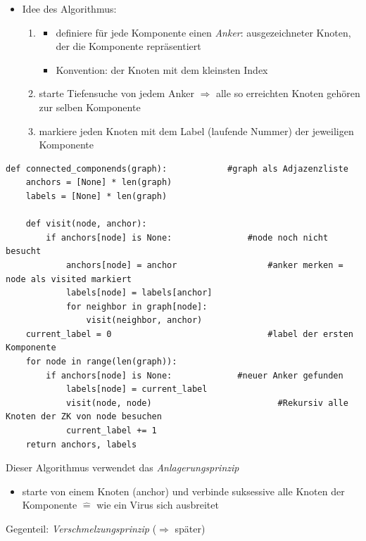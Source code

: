 \begin{itemize}
            \item Idee des Algorithmus:
            \begin{enumerate}
            \item
            \begin{itemize}
            \item definiere für jede Komponente einen \emph{Anker}: ausgezeichneter Knoten, der die Komponente repräsentiert
            \item Konvention: der Knoten mit dem kleinsten Index
            \end{itemize}
            \item starte Tiefensuche von jedem Anker $\Rightarrow$ alle so erreichten Knoten gehören zur selben Komponente
            \item markiere jeden Knoten mit dem Label (laufende Nummer) der jeweiligen Komponente
            \end{enumerate}
            \end{itemize}

            \begin{verbatim}
def connected_componends(graph):            #graph als Adjazenzliste
    anchors = [None] * len(graph)
    labels = [None] * len(graph)

    def visit(node, anchor):
        if anchors[node] is None:               #node noch nicht besucht
            anchors[node] = anchor                  #anker merken = node als visited markiert
            labels[node] = labels[anchor]
            for neighbor in graph[node]:
                visit(neighbor, anchor)
    current_label = 0                               #label der ersten Komponente
    for node in range(len(graph)):
        if anchors[node] is None:             #neuer Anker gefunden
            labels[node] = current_label
            visit(node, node)                         #Rekursiv alle Knoten der ZK von node besuchen
            current_label += 1
    return anchors, labels
            \end{verbatim}
            Dieser Algorithmus verwendet das \emph{Anlagerungsprinzip}
            \begin{itemize}
                \item starte von einem Knoten (anchor) und verbinde suksessive alle Knoten der Komponente $\widehat{=}$ wie ein Virus sich ausbreitet
            \end{itemize}
            Gegenteil: \emph{Verschmelzungsprinzip} ($\Rightarrow$ später)\\

